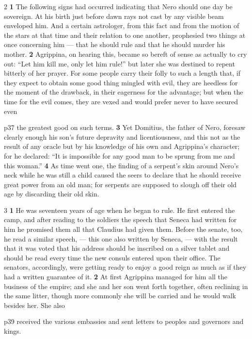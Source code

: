 2 \textbf{1} The following signs had occurred indicating that Nero should one day be sovereign. At his birth just before dawn rays not cast by any visible beam enveloped him. And a certain astrologer, from this fact and from the motion of the stars at that time and their relation to one another, prophesied two things at once concerning him \texthebrew{—} that he should rule and that he should murder his mother. \textbf{2} Agrippina, on hearing this, became so bereft of sense as actually to cry out: ``Let him kill me, only let him rule!'' but later she was destined to repent bitterly of her prayer. For some people carry their folly to such a length that, if they expect to obtain some good thing mingled with evil, they are heedless for the moment of the drawback, in their eagerness for the advantage; but when the time for the evil comes, they are vexed and would prefer never to have secured even

p37 the greatest good on such terms. \textbf{3} Yet Domitius, the father of Nero, foresaw clearly enough his son's future depravity and licentiousness, and this not as the result of any oracle but by his knowledge of his own and Agrippina's character; for he declared: ``It is impossible for any good man to be sprung from me and this woman.'' \textbf{4} As time went one, the finding of a serpent's skin around Nero's neck while he was still a child caused the seers to declare that he should receive great power from an old man; for serpents are supposed to slough off their old age by discarding their old skin.

3 \textbf{1} He was seventeen years of age when he began to rule. He first entered the camp, and after reading to the soldiers the speech that Seneca had written for him he promised them all that Claudius had given them. Before the senate, too, he read a similar speech, \texthebrew{—} this one also written by Seneca, \texthebrew{—} with the result that it was voted that his address should be inscribed on a silver tablet and should be read every time the new consuls entered upon their office. The senators, accordingly, were getting ready to enjoy a good reign as much as if they had a written guarantee of it. \textbf{2} At first Agrippina managed for him all the business of the empire; and she and her son went forth together, often reclining in the same litter, though more commonly she will be carried and he would walk besides her. She also

p39 received the various embassies and sent letters to peoples and governors and kings.

